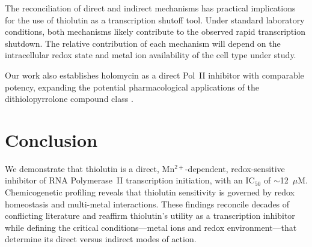 \documentclass[11pt]{article}
\begin{document}
The reconciliation of direct and indirect mechanisms has practical implications for the use of thiolutin as a transcription shutoff tool. Under standard laboratory conditions, both mechanisms likely contribute to the observed rapid transcription shutdown. The relative contribution of each mechanism will depend on the intracellular redox state and metal ion availability of the cell type under study.

Our work also establishes holomycin as a direct Pol~II inhibitor with comparable potency, expanding the potential pharmacological applications of the dithiolopyrrolone compound class \citep{chan2017}.

\section{Conclusion}

We demonstrate that thiolutin is a direct, Mn$^{2+}$-dependent, redox-sensitive inhibitor of RNA Polymerase~II transcription initiation, with an IC$_{50}$ of $\sim$12~$\mu$M. Chemicogenetic profiling reveals that thiolutin sensitivity is governed by redox homeostasis and multi-metal interactions. These findings reconcile decades of conflicting literature and reaffirm thiolutin's utility as a transcription inhibitor while defining the critical conditions---metal ions and redox environment---that determine its direct versus indirect modes of action.



\end{document}
